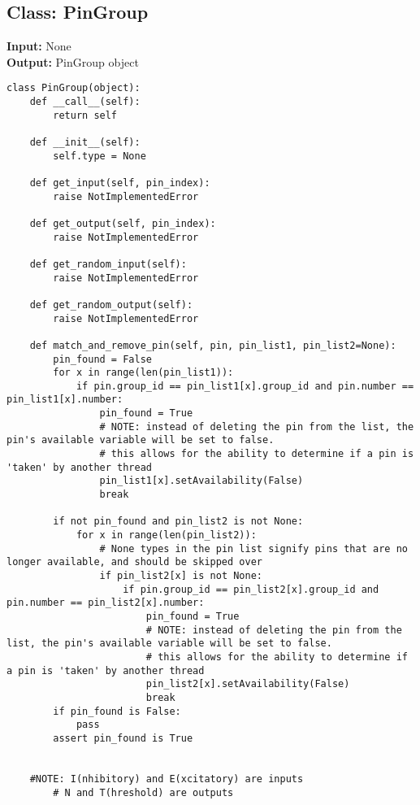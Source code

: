 \documentclass[a4paper]{article}
\begin{document}
\subsection{Class: PinGroup}
\label{sec-4-3}
\textbf{Input:} None\\
\textbf{Output:} PinGroup object\\
\begin{verbatim}
class PinGroup(object):
    def __call__(self):
        return self

    def __init__(self):
        self.type = None

    def get_input(self, pin_index):
        raise NotImplementedError

    def get_output(self, pin_index):
        raise NotImplementedError

    def get_random_input(self):
        raise NotImplementedError

    def get_random_output(self):
        raise NotImplementedError

    def match_and_remove_pin(self, pin, pin_list1, pin_list2=None):
        pin_found = False
        for x in range(len(pin_list1)):
            if pin.group_id == pin_list1[x].group_id and pin.number == pin_list1[x].number:
                pin_found = True
                # NOTE: instead of deleting the pin from the list, the pin's available variable will be set to false.
                # this allows for the ability to determine if a pin is 'taken' by another thread
                pin_list1[x].setAvailability(False)
                break

        if not pin_found and pin_list2 is not None:
            for x in range(len(pin_list2)):
                # None types in the pin list signify pins that are no longer available, and should be skipped over
                if pin_list2[x] is not None:
                    if pin.group_id == pin_list2[x].group_id and pin.number == pin_list2[x].number:
                        pin_found = True
                        # NOTE: instead of deleting the pin from the list, the pin's available variable will be set to false.
                        # this allows for the ability to determine if a pin is 'taken' by another thread
                        pin_list2[x].setAvailability(False)
                        break
        if pin_found is False:
            pass
        assert pin_found is True


    #NOTE: I(nhibitory) and E(xcitatory) are inputs
        # N and T(hreshold) are outputs
\end{verbatim}
\end{document}
